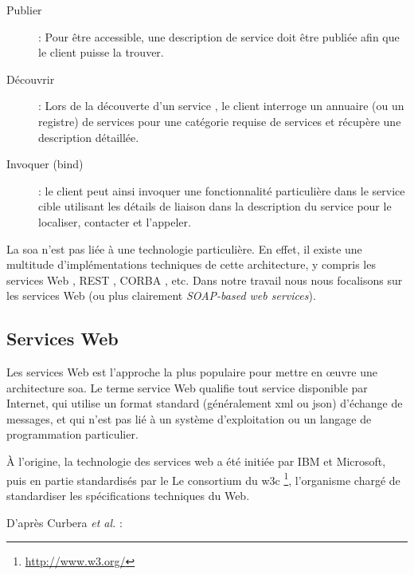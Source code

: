   \renewcommand{\descriptionlabel}[1]{\hspace{0.5cm}\textbullet~\textsf{#1}}
  \begin{description}
  \item[Publier]: Pour être accessible, une description de service
    doit être publiée afin que le client puisse la trouver.

  \item[Découvrir]: Lors de la découverte d'un service , le client
    interroge un annuaire (ou un registre) de services pour une
    catégorie requise de services et récupère une description
    détaillée.

  \item[Invoquer (bind)]: le client peut ainsi invoquer une
    fonctionnalité particulière dans le service cible utilisant les
    détails de liaison dans la description du service pour le
    localiser, contacter et l'appeler.
  \end{description}
  \enddescription

  La \acrshort{soa} n'est pas liée à une technologie particulière. En
  effet, il existe une multitude d'implémentations techniques de cette
  architecture, y compris les services Web \cite{WSA}, REST
  \cite{fielding2000architectural}, CORBA \cite{vinoski1997corba},
  etc. Dans notre travail nous nous focalisons sur les services Web
  (ou plus clairement \textit{SOAP-based web services}).

  \subsection{Services Web}
  \label{sec:ws-def}
  Les services Web est l'approche la plus populaire pour mettre en
  œuvre une architecture \acrshort{soa}. Le terme service Web qualifie
  tout service disponible par Internet, qui utilise un format standard
  (généralement \acrshort{xml} ou \acrshort{json}) d'échange de
  messages, et qui n'est pas lié à un système d'exploitation ou un
  langage de programmation particulier.\\\medskip

  À l'origine, la technologie des services web a été initiée par IBM
  \cite{kreger2001web} et Microsoft, puis en partie standardisés par
  le Le consortium du \acrshort{w3c}
  \footnote{\url{http://www.w3.org/}}, l'organisme chargé de
  standardiser les spécifications techniques du Web.\medskip

  D'après Curbera \emph{et al.} \cite{curbera2001web}:\bigskip

